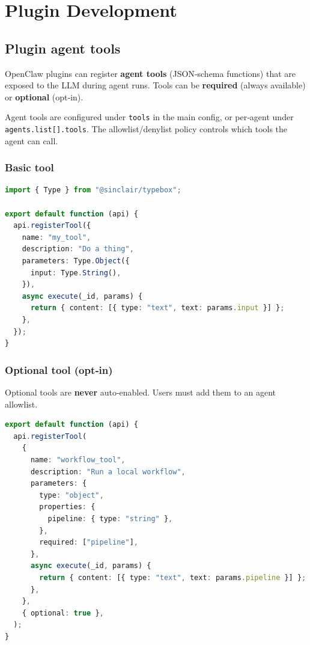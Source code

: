\chapter{Plugin Development}

\section{Plugin agent tools}


OpenClaw plugins can register \textbf{agent tools} (JSON‑schema functions) that are exposed
to the LLM during agent runs. Tools can be \textbf{required} (always available) or
\textbf{optional} (opt‑in).

Agent tools are configured under \texttt{tools} in the main config, or per‑agent under
\texttt{agents.list[].tools}. The allowlist/denylist policy controls which tools the agent
can call.

\subsection{Basic tool}


\begin{lstlisting}[language=typescript]
import { Type } from "@sinclair/typebox";

export default function (api) {
  api.registerTool({
    name: "my_tool",
    description: "Do a thing",
    parameters: Type.Object({
      input: Type.String(),
    }),
    async execute(_id, params) {
      return { content: [{ type: "text", text: params.input }] };
    },
  });
}
\end{lstlisting}


\subsection{Optional tool (opt‑in)}


Optional tools are \textbf{never} auto‑enabled. Users must add them to an agent
allowlist.

\begin{lstlisting}[language=typescript]
export default function (api) {
  api.registerTool(
    {
      name: "workflow_tool",
      description: "Run a local workflow",
      parameters: {
        type: "object",
        properties: {
          pipeline: { type: "string" },
        },
        required: ["pipeline"],
      },
      async execute(_id, params) {
        return { content: [{ type: "text", text: params.pipeline }] };
      },
    },
    { optional: true },
  );
}
\end{lstlisting}


